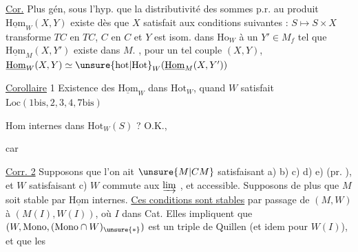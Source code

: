

\uline{Cor.} Plus gén,  sous l'hyp.  que la distributivité des sommes p.r. au produit
$\underline{\mathrm{Hom}}_W(X,Y)$ existe dès que $X$ satisfait aux conditions suivantes :
$S\longmapsto S\times X$ transforme $TC$ en $TC$, $C$ en $C$ et 
$Y$ est isom. dans $\mathrm{Ho}_W$ à un $Y'\in M_f$ tel que
$\underline{\mathrm{Hom}}_M(X,Y')$ existe dans $M$. , pour un tel couple $(X,Y)$,
$\underline{\mathrm{Hom}}_W(X,Y)\simeq\unsure{\mathrm{hot}|\mathrm{Hot}}_W(\underline{\mathrm{Hom}}_M(X,Y'))$

\uline{Corollaire} 1 Existence des $\underline{\mathrm{Hom}}_W$ dans $\mathrm{Hot}_W$, quand $W$ satisfait $\mathrm{Loc}(1\mathrm{bis},2,3,4,7\mathrm{bis})$

$\mathrm{Hom}$ internes dans $\mathrm{Hot}_W(S)$ ? O.K.,

car 


\uline{Corr. 2} Supposons que l'on ait $\unsure{M|CM}$ satisfaisant  a) b) c) d) e)  (pr. ), et $W$ satisfaisant
c) $W$ commute aux $\varinjlim$ , et accessible. Supposons de plus que $M$ soit stable par $\underline{\mathrm{Hom}}$ internes.   \uline{Ces conditions sont stables} par passage de $(M,W)$ à $(M(I),W(I))$, où $I$ dans Cat. Elles impliquent que $(W,\mathrm{Mono},(\mathrm{Mono}\cap W)_{\unsure{*}})$ est un triple de Quillen  (et idem pour $W(I)$), et que les

